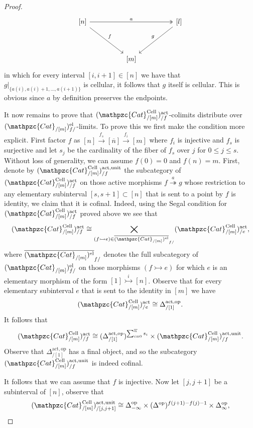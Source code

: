 \documentclass[a4paper, reqno]{amsart}
\theoremstyle{definition}
\newcommand\op{\mathrm{op}}
\newcommand\ccat{\mathpzc{Cat}}
\newcommand\cell{\mathrm{Cell}}
\newcommand\un{\mathrm{unit}}
\newcommand\act{\mathrm{act}}
\newcommand\el{\mathrm{el}}
\begin{document}
\begin{proof}
\[
\begin{tikzcd}[row sep=huge, column sep=huge]
{[n]}\arrow[rr,two heads, "a"]\arrow[rd, "f"]&{}&{[l]}\arrow[ld, "g" swap]\\
{}&{[m]}
\end{tikzcd}
\]
in which for every interval $[i,i+1]\in[n]$ we have that $g|_{\{a(i),a(i)+1,...,a(i+1)\}}$ is cellular, it follows that $g$ itself is cellular. This is obvious since $a$ by definition preserves the endpoints.\par
It now remains to prove that $(\mathpzc{Cat}^{\mathrm{Cell}}_{/[m]})^\act_{/f}$-colimits distribute over $(\ccat_{/[m]})^\el_{f/}$-limits. To prove this we first make the condition more explicit. First factor $f$ as $[n]\xrightarrow{f_s}[\overline{n}]\xrightarrow{f_i}[m]$ where $f_i$ is injective and $f_s$ is surjective and let $s_j$ be the cardinality of the fiber of $f_s$ over $j$ for $0\leq j\leq s$. Without loss of generality, we can assume $f(0)=0$ and $f(n)=m$. First, denote by $(\ccat^\cell_{/[m]})^{\act,\un}_{/f}$ the subcategory of $(\ccat^\cell_{/[m]})^\act_{/f}$ on those active morphisms $f\overset{a}{\twoheadrightarrow}g$ whose restriction to any elementary subinterval $[s,s+1]\subset [n]$ that is sent to a point by $f$ is identity, we claim that it is cofinal. Indeed, using the Segal condition for $(\ccat^\cell_{/[m]})^\act_{/f}$ proved above we see that
\[(\ccat^\cell_{/[m]})^\act_{/f}\cong\bigtimes_{(f\rightarrowtail e)\in\overline{(\ccat_{/[m]})^\el}_{f/}}(\ccat^\cell_{/[m]})^\act_{/e},\]
where $\overline{(\ccat_{/[m]})^\el}_{f/}$ denotes the full subcategory of $(\ccat_{/[m]})^\el_{f/}$ on those morphisms $(f\rightarrowtail e)$ for which $e$ is an elementary morphism of the form $[1]\overset{i}{\rightarrowtail} [n]$. Observe that for every elementary subinterval $e$ that is sent to the identity in $[m]$ we have
\[(\ccat^\cell_{/[m]})^\act_{/e}\cong \Delta^{\act,\op}_{/[1]}.\]
It follows that
\[(\ccat^\cell_{/[m]})^\act_{/f}\cong(\Delta^{\act,\op}_{/[1]})^{\sum_{i=0}^{\overline{n}} s_i}\times (\ccat^\cell_{/[m]})^{\act,\un}_{/f}.\]
Observe that $\Delta^{\act,\op}_{/[1]}$ has a final object, and so the subcategory $(\ccat^\cell_{/[m]})^{\act,\un}_{/f}$ is indeed cofinal.\par
It follows that we can assume that $f$ is injective. Now let $[j,j+1]$ be a subinterval of $[n]$, observe that 
\[(\ccat^\cell_{/[m]})^{\act,\un}_{/[j,j+1]}\cong\Delta^\op_{-\infty}\times(\Delta^\op)^{f(j+1)-f(j)-1}\times\Delta^\op_\infty,\]

\end{proof}
\end{document}
